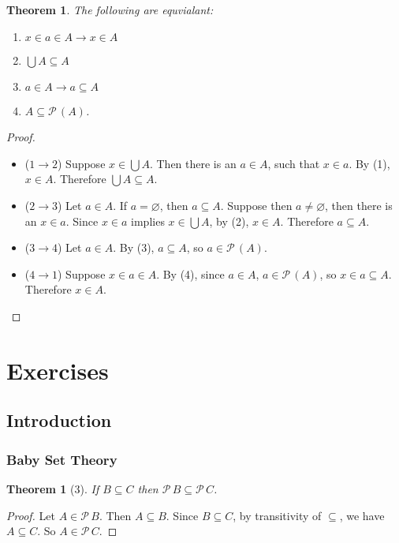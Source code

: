 \documentclass[12pt]{article}
\theoremstyle{plain}
\newtheorem{thm}{Theorem}[section]
\newtheorem*{exthm}{Theorem}
\theoremstyle{remark}
\theoremstyle{definition}
\theoremstyle{remark}
\newcommand{\powerset}{\mathscr{P}\,}
\begin{document}
\begin{thm}
  The following are equvialant:
  \begin{enumerate}
    \item $x \in a \in A \rightarrow x \in A$
    \item $\bigcup A \subseteq A$
    \item $a \in A \rightarrow a \subseteq A$
    \item $A \subseteq \powerset(A)$.
  \end{enumerate}
\end{thm}
\begin{proof}
  \begin{itemize}
    \item ($1 \rightarrow 2$) Suppose $x \in \bigcup A$. Then there is an $a \in A$, such that $x \in a$. By (1), $x \in A$. Therefore $\bigcup A \subseteq A$.

    \item ($2 \rightarrow 3$) Let $a \in A$. If $a = \varnothing$, then $a \subseteq A$. Suppose then $a \neq \varnothing$, then there is an $x \in a$. Since $x \in a$ implies $x \in \bigcup A$, by (2), $x \in A$. Therefore $a \subseteq A$.

    \item ($3 \rightarrow 4$) Let $a \in A$. By (3), $a \subseteq A$, so $a \in \powerset(A)$.

    \item ($4 \rightarrow 1$) Suppose $x \in a \in A$. By (4), since $a \in A$, $a \in \powerset(A)$, so $x \in a \subseteq A$. Therefore $x \in A$.
  \end{itemize}
\end{proof}

\section{Exercises}
\subsection{Introduction}

\subsubsection{Baby Set Theory}
\begin{exthm}[3]
  If $B \subseteq C$ then $\powerset B \subseteq \powerset C$.
\end{exthm}
\begin{proof}
  Let $A \in \powerset B$. Then $A \subseteq B$. Since $B \subseteq C$, by transitivity of $\subseteq$, we have $A \subseteq C$. So $A \in \powerset C$.
\end{proof}
\end{document}
